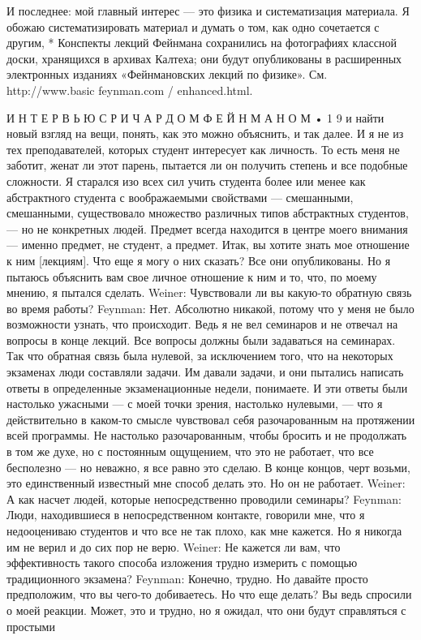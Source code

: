 \documentclass[11pt,oneside]{article}
\begin{document}
И последнее: мой главный интерес --- это физика и систематизация материала. Я обожаю систематизировать материал и думать о том, как одно сочетается с другим, * Конспекты лекций Фейнмана сохранились на фотографиях классной доски, хранящихся в архивах Калтеха; они будут опубликованы в расширенных электронных изданиях «Фейнмановских лекций по физике». См. http://www.basic feynman.com / enhanced.html.\par



И Н Т Е Р В Ь Ю  С  Р И Ч А Р Д О М  Ф Е Й Н М А Н О М • 1 9 и найти новый взгляд на вещи, понять, как это можно объяснить, и так далее. И я не из тех преподавателей, которых студент интересует как личность. То есть меня не заботит, женат ли этот парень, пытается ли он получить степень и все подобные сложности. Я старался изо всех сил учить студента более или менее как абстрактного студента с воображаемыми свойствами --- смешанными, смешанными, существовало множество различных типов абстрактных студентов, --- но не конкретных людей. Предмет всегда находится в центре моего внимания --- именно предмет, не студент, а предмет. Итак, вы хотите знать мое отношение к ним [лекциям]. Что еще я могу о них сказать? Все они опубликованы. Но я пытаюсь объяснить вам свое личное отношение к ним и то, что, по моему мнению, я пытался сделать. Weiner: Чувствовали ли вы какую-то обратную связь во время работы? Feynman: Нет. Абсолютно никакой, потому что у меня не было возможности узнать, что происходит. Ведь я не вел семинаров и не отвечал на вопросы в конце лекций. Все вопросы должны были задаваться на семинарах. Так что обратная связь была нулевой, за исключением того, что на некоторых экзаменах люди составляли задачи. Им давали задачи, и они пытались написать ответы в определенные экзаменационные недели, понимаете. И эти ответы были настолько ужасными --- с моей точки зрения, настолько нулевыми, --- что я действительно в каком-то смысле чувствовал себя разочарованным на протяжении всей программы. Не настолько разочарованным, чтобы бросить и не продолжать в том же духе, но с постоянным ощущением, что это не работает, что все бесполезно --- но неважно, я все равно это сделаю. В конце концов, черт возьми, это единственный известный мне способ делать это. Но он не работает. Weiner: А как насчет людей, которые непосредственно проводили семинары? Feynman: Люди, находившиеся в непосредственном контакте, говорили мне, что я недооцениваю студентов и что все не так плохо, как мне кажется. Но я никогда им не верил и до сих пор не верю. Weiner: Не кажется ли вам, что эффективность такого способа изложения трудно измерить с помощью традиционного экзамена? Feynman: Конечно, трудно. Но давайте просто предположим, что вы чего-то добиваетесь. Но что еще делать? Вы ведь спросили о моей реакции. Может, это и трудно, но я ожидал, что они будут справляться с простыми\par
\end{document}
